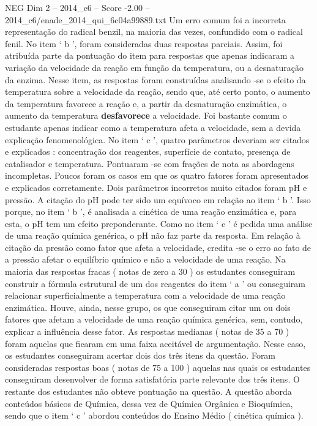 \begin{textsample}{NEG Dim 2 – 2014\_c6 – Score -2.00 – 2014\_c6/enade\_2014\_qui\_6c04a99889.txt}
Um erro comum foi a incorreta representação do radical benzil, na maioria das vezes, confundido com o radical fenil.
No item ‘ b ’, foram consideradas duas respostas parciais.
Assim, foi atribuída parte da pontuação do item para respostas que apenas indicaram a variação da velocidade da reação em função da temperatura, ou a desnaturação da enzima.
Nesse item, as respostas foram construídas analisando -se o efeito da temperatura sobre a velocidade da reação, sendo que, até certo ponto, o aumento da temperatura favorece a reação e, a partir da desnaturação enzimática, o aumento da temperatura \textbf{desfavorece} a velocidade.
Foi bastante comum o estudante apenas indicar como a temperatura afeta a velocidade, sem a devida explicação fenomenológica.
No item ‘ c ’, quatro parâmetros deveriam ser citados e explicados : concentração dos reagentes, superfície de contato, presença de catalisador e temperatura.
Pontuaram -se com frações de nota as abordagens incompletas.
Poucos foram os casos em que os quatro fatores foram apresentados e explicados corretamente.
Dois parâmetros incorretos muito citados foram pH e pressão.
A citação do pH pode ter sido um equívoco em relação ao item ‘ b ’.
Isso porque, no item ‘ b ’, é analisada a cinética de uma reação enzimática e, para esta, o pH tem um efeito preponderante.
Como no item ‘ c ’ é pedida uma análise de uma reação química genérica, o pH não faz parte da resposta.
Em relação à citação da pressão como fator que afeta a velocidade, credita -se o erro ao fato de a pressão afetar o equilíbrio químico e não a velocidade de uma reação.
Na maioria das respostas fracas ( notas de zero a 30 ) os estudantes conseguiram construir a fórmula estrutural de um dos reagentes do item ‘ a ’ ou conseguiram relacionar superficialmente a temperatura com a velocidade de uma reação enzimática.
Houve, ainda, nesse grupo, os que conseguiram citar um ou dois fatores que afetam a velocidade de uma reação química genérica, sem, contudo, explicar a influência desse fator.
As respostas medianas ( notas de 35 a 70 ) foram aquelas que ficaram em uma faixa aceitável de argumentação.
Nesse caso, os estudantes conseguiram acertar dois dos três itens da questão.
Foram consideradas respostas boas ( notas de 75 a 100 ) aquelas nas quais os estudantes conseguiram desenvolver de forma satisfatória parte relevante dos três itens.
O restante dos estudantes não obteve pontuação na questão.
A questão aborda conteúdos básicos de Química, dessa vez de Química Orgânica e Bioquímica, sendo que o item ‘ c ’ abordou conteúdos do Ensino Médio ( cinética química ).

\end{textsample}
